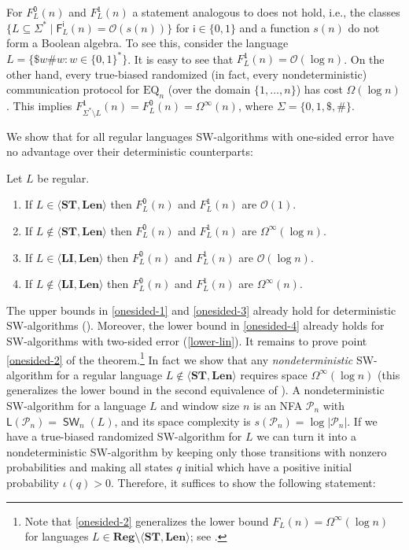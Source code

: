 \documentclass{theoretics}
\renewcommand{\O}{\mathcal{O}}
\renewcommand{\P}{\mathcal{P}}
\newcommand{\F}{\mathsf{F}}
\renewcommand{\L}{\mathsf{L}}
\DeclareMathOperator{\SW}{\mathsf{SW}}
\newcommand{\Reg}{\mathbf{Reg}}
\newcommand{\Len}{\mathbf{Len}}
\newcommand{\LI}{\mathbf{LI}}
\newcommand{\ST}{\mathbf{ST}}
\newcommand{\Omegainf}{\Omega^{\scriptscriptstyle{\infty}}}
\begin{document}
For $F^\mathsf{0}_L(n)$ and $F^\mathsf{1}_L(n)$ a statement analogous to  does not hold, i.e., 
the classes  $\{ L \subseteq \Sigma^* \mid \F^\mathsf{i}_L(n) = \O(s(n)) \}$ for $\mathsf{i} \in \{0,1\}$ and a function $s(n)$ do not
form a Boolean algebra. To see this, consider the language $L= \{ \$ w \# w : w \in \{0,1\}^*\}$. It is easy to see
that $F^\mathsf{1}_{L}(n) = \O(\log n)$. On the other hand, every true-biased randomized (in fact, every nondeterministic)
communication protocol for $\mathrm{EQ}_n$ (over the domain $\{1, \dots, n\}$) has cost $\Omega(\log n)$ \cite[Chapter~5]{Roughgarden16}. This implies
$F^\mathsf{1}_{\Sigma^* \setminus L}(n) = F^\mathsf{0}_{L}(n)  = \Omegainf(n)$, where $\Sigma= \{ 0,1,\$, \#\}$.


We show that for all regular languages
SW-algorithms with one-sided error have no advantage over their deterministic counterparts:
\begin{theorem}
\label{thm:trichotomy-one-sided}
Let $L$ be regular.
\begin{enumerate}[label=(\roman{*}), ref=(\roman{*})]
	\item If $L \in \langle \ST, \Len \rangle$ then
	$F^\mathsf{0}_L(n)$ and $F^\mathsf{1}_L(n)$ are $\O(1)$. \label{onesided-1}
	\item If $L \notin \langle \ST, \Len \rangle$ then
	$F^\mathsf{0}_L(n)$ and $F^\mathsf{1}_L(n)$ are $\Omegainf(\log n)$. \label{onesided-2}
	\item If $L \in \langle \LI, \Len \rangle$ then
	$F^\mathsf{0}_L(n)$ and $F^\mathsf{1}_L(n)$ are $\O(\log n)$. \label{onesided-3}
	\item If $L \notin \langle \LI, \Len \rangle$ then
	$F^\mathsf{0}_L(n)$ and $F^\mathsf{1}_L(n)$ are $\Omegainf(n)$. \label{onesided-4}
\end{enumerate}
\end{theorem}
The upper bounds in \ref{onesided-1} and \ref{onesided-3} already hold
for deterministic SW-algorithms ().
Moreover, the lower bound in \ref{onesided-4} already holds for SW-algorithms with two-sided error
(\ref{lower-lin}).
It remains to prove point \ref{onesided-2} of the theorem.\footnote{Note that \eqref{onesided-2}
generalizes the lower bound $F_L(n) = \Omegainf(\log n)$ for languages $L  \in \Reg \setminus \langle \ST, \Len \rangle$; see .}
In fact we show that any {\em nondeterministic} SW-algorithm
for a regular language $L \notin \langle \ST, \Len \rangle$
requires space $\Omegainf(\log n)$ (this generalizes the lower bound in the second equivalence of ).
A nondeterministic SW-algorithm for a language $L$ and window size $n$ is an NFA $\P_n$
with $\L(\P_n) = \SW_n(L)$, and its space complexity is $s(\P_n) = \log |\P_n|$.
If we have a true-biased randomized SW-algorithm for $L$ we can turn it into a
nondeterministic SW-algorithm by keeping only those transitions with nonzero probabilities
and making all states $q$ initial which have a positive initial probability $\iota(q) > 0$.
Therefore, it suffices to show the following statement:
\end{document}
